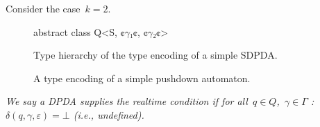 Consider the case~$k=2$.
\begin{figure}
  \begin{JAVA}
abstract class Q<S, ¢$γ₁$¢, ¢$γ₂$¢>
  \end{JAVA}
\end{figure}

\begin{figure}
  \caption{\label{Figure:SDPDA:hierarchy}%
    Type hierarchy of the type encoding of a simple SDPDA.
  }
  \begin{adjustbox}{}
    
  \end{adjustbox}
\end{figure}

\begin{figure}
  \caption{\label{Figure:SDPDA:example}%
    A type encoding of a simple pushdown automaton.
  }
\end{figure}
\begin{Definition}
  \label{Definition:realtime}
  \slshape
We say a DPDA supplies the \emph{realtime condition} if
  for all~$q∈Q$,~$γ∈Γ$ :~$δ(q,γ,ε)=⊥$ (i.e., undefined).
\end{Definition}
